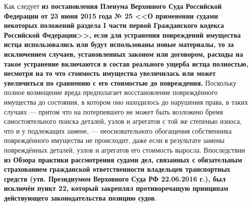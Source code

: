 Как следует \textbf{из постановления Пленума Верховного Суда Российской Федерации от 23 июня 2015 года № 25 <<О применении судами некоторых положений раздела I части первой Гражданского кодекса Российской Федерации>>, если для устранения повреждений имущества истца использовались или будут использованы новые материалы, то за исключением случаев, установленных законом или договором, расходы на такое устранение включаются в состав реального ущерба истца полностью, несмотря на то что стоимость имущества увеличилась или может увеличиться по сравнению с его стоимостью до повреждения.} 
Поскольку полное возмещение вреда предполагает восстановление повреждённого имущества до состояния, в котором оно находилось до нарушения права, в таких случаях — притом что на потерпевшего не может быть возложено бремя самостоятельного поиска деталей, узлов и агрегатов с той же степенью износа, что и у подлежащих замене, — неосновательного обогащения собственника повреждённого имущества не происходит, даже если в результате замены повреждённых деталей, узлов и агрегатов его стоимость выросла.
Впоследствии \textbf{из Обзора практики рассмотрения судами дел, связанных с обязательным страхованием гражданской ответственности владельцев транспортных средств (утв. Президиумом Верховного Суда РФ 22.06.2016 г.), был исключён пункт 22, который закреплял противоречащую принципам действующего законодательства позицию судов}.